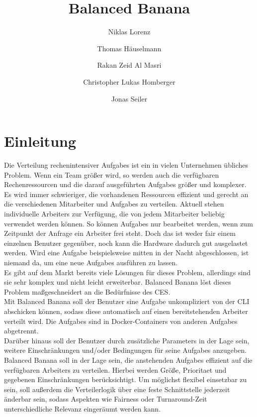 \documentclass[a4paper,12pt]{article}
\title{Balanced Banana}
\author{Niklas Lorenz \and Thomas Häuselmann \and Rakan Zeid Al Masri \and Christopher Lukas Homberger \and Jonas Seiler}
\begin{document}
\setcounter{page}{2}
\tableofcontents          %
\clearpage
{}

\section{Einleitung}
\vspace*{1cm}

Die Verteilung rechenintensiver \glspl{Aufgabe} ist ein in vielen Unternehmen übliches Problem. Wenn ein Team größer wird, so werden auch die verfügbaren Rechenressourcen und die darauf ausgeführten \glspl{Aufgabe} größer und komplexer.\\


Es wird immer schwieriger, die vorhandenen Ressourcen effizient und gerecht an die verschiedenen Mitarbeiter und \glspl{Aufgabe} zu verteilen.
Aktuell stehen individuelle \glspl{Arbeiter} zur Verfügung, die von jedem Mitarbeiter beliebig verwendet werden können. So können \glspl{Aufgabe} nur bearbeitet werden, wenn zum Zeitpunkt der Anfrage ein \gls{Arbeiter} frei steht. Doch das ist weder fair einem einzelnen \gls{Benutzer} gegenüber, noch kann die Hardware dadurch gut ausgelastet werden. Wird eine \gls{Aufgabe} beispielsweise mitten in der Nacht abgeschlossen, ist niemand da, um eine neue \glspl{Aufgabe} ausführen zu lassen. \\


Es gibt auf dem Markt bereits viele Lösungen für dieses Problem, allerdings sind sie sehr komplex und nicht leicht erweiterbar.
Balanced Banana löst dieses Problem maßgeschneidert an die Bedürfnisse des CES. \\

Mit Balanced Banana soll der \gls{Benutzer} sine \gls{Aufgabe} unkompliziert von der \gls{CLI} abschicken können, sodass diese automatisch auf einen bereitstehenden \gls{Arbeiter} verteilt wird. Die \glspl{Aufgabe} sind in \glspl{Docker-Container} von anderen \glspl{Aufgabe} abgetrennt.  \\

Darüber hinaus soll der \gls{Benutzer} durch zusätzliche \glspl{Parameter} in der Lage sein, weitere Einschränkungen und/oder Bedingungen für seine \glspl{Aufgabe} anzugeben.\\

Balanced Banana soll in der Lage sein, die anstehenden \glspl{Aufgabe} effizient auf die verfügbaren \glspl{Arbeiter} zu verteilen. Hierbei werden Größe, \gls{Prioritaet} und gegebenen Einschränkungen berücksichtigt. Um möglichst flexibel einsetzbar zu sein, soll außerdem die \gls{Verteilerlogik} über eine feste \gls{Schnittstelle} jederzeit änderbar sein, sodass Aspekten wie Fairness oder \gls{Turnaround}-Zeit unterschiedliche Relevanz eingeräumt werden kann.
\end{document}
